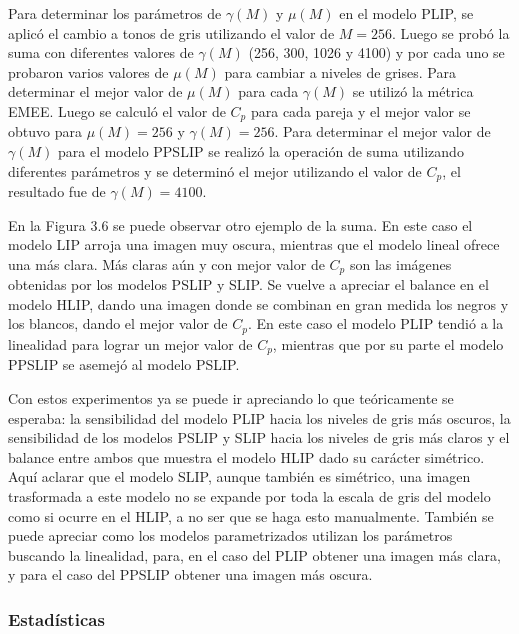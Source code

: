 Para determinar los par\'ametros de $\gamma(M)$ y $\mu(M)$ en el modelo PLIP, se aplic\'o el cambio a tonos de gris utilizando el valor de $M=256$. Luego se prob\'o la suma con diferentes valores de $\gamma(M)$ (256, 300, 1026 y 4100) y por cada uno se probaron varios valores de $\mu(M)$ para cambiar a niveles de grises. Para determinar el mejor valor de $\mu(M)$ para cada $\gamma(M)$ se utiliz\'o la m\'etrica EMEE. Luego se calcul\'o el valor de $C_p$ para cada pareja y el mejor valor se obtuvo para $\mu(M)=256$ y $\gamma(M)=256$. Para determinar el mejor valor de $\gamma(M)$ para el modelo PPSLIP se realiz\'o la operaci\'on de suma utilizando diferentes par\'ametros y se determin\'o el mejor utilizando el valor de $C_p$, el resultado fue de $\gamma(M)=4100$. 

En la Figura 3.6 se puede observar otro ejemplo de la suma. En este caso el modelo LIP arroja una imagen muy oscura, mientras que el modelo lineal ofrece una m\'as clara. M\'as claras a\'un y con mejor valor de $C_p$ son las im\'agenes obtenidas por los modelos PSLIP y SLIP. Se vuelve a apreciar el balance en el modelo HLIP, dando una imagen donde se combinan en gran medida los negros y los blancos, dando el mejor valor de $C_p$. En este caso el modelo PLIP tendi\'o a la linealidad para lograr un mejor valor de $C_p$, mientras que por su parte el modelo PPSLIP se asemej\'o al modelo PSLIP.

Con estos experimentos ya se puede ir apreciando lo que te\'oricamente se esperaba: la sensibilidad del modelo PLIP hacia los niveles de gris m\'as oscuros, la sensibilidad de los modelos PSLIP y SLIP hacia los niveles de gris m\'as claros y el balance entre ambos que muestra el modelo HLIP dado su car\'acter sim\'etrico. Aqu\'i aclarar que el modelo SLIP, aunque tambi\'en es sim\'etrico, una imagen trasformada a este modelo no se expande por toda la escala de gris del modelo como si ocurre en el HLIP, a no ser que se haga esto manualmente. Tambi\'en se puede apreciar como los modelos parametrizados utilizan los par\'ametros buscando la linealidad, para, en el caso del PLIP obtener una imagen m\'as clara, y para el caso del PPSLIP obtener una imagen m\'as oscura. 

\subsubsection{Estad\'isticas}

